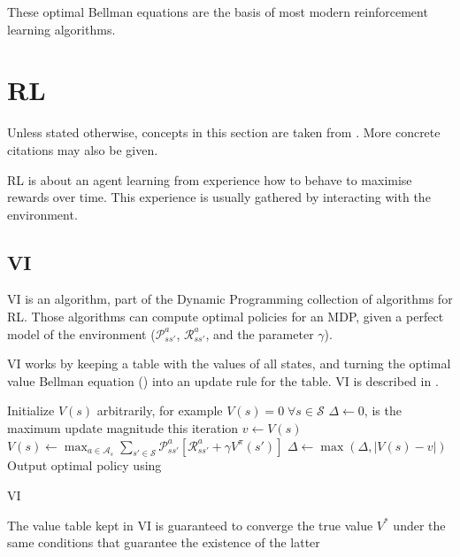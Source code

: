 These optimal Bellman equations are the basis of most modern reinforcement
learning algorithms.


\section{\acl{RL}}
Unless stated otherwise, concepts in this section are taken from
\citet{sutton1998introduction}. More concrete citations may also be given.

\acf{RL} is about an agent learning from experience how to behave to maximise
rewards over time. This experience is usually gathered by interacting with the
environment.

\subsection{\acl{VI}\label{subsec:VI}}
\acf{VI} is an algorithm, part of the Dynamic Programming collection of
algorithms for \ac{RL}. Those algorithms can compute optimal policies for an
\ac{MDP}, given a perfect model of the environment ($\mathcal{P}^a_{ss'}$,
$\mathcal{R}^a_{ss'}$, and the parameter $\gamma$).

\ac{VI} works by keeping a table with the values of all states, and
turning the optimal value Bellman equation () into an
update rule for the table. \ac{VI} is described in .

\begin{algorithm}[hbtp]
\begin{algorithmic}
\State Initialize $V(s)$ arbitrarily, for example $V(s)=0 \; \forall s\in\mathcal{S}$
\Repeat
  \State $\Delta \gets 0$, is the maximum update magnitude this iteration
    \State $v \gets V(s)$
    \State $V(s) \gets \max_{a\in\mathcal{A}_s}\sum_{s' \in \mathcal{S}}\mathcal{P}^a_{ss'} \left[\mathcal{R}^a_{ss'} + \gamma V^\pi(s') \right]$
    \State $\Delta \gets \max(\Delta, \left|V(s) - v \right|)$
    \EndFor
{}
\State Output optimal policy using 
\end{algorithmic}
\caption{\acl{VI} \citep[Section~4.4]{sutton1998introduction}}
\label{alg:value-iteration}
\end{algorithm}

The value table kept in \ac{VI} is guaranteed to converge the true value $V^*$
under the same conditions that guarantee the existence of the latter

